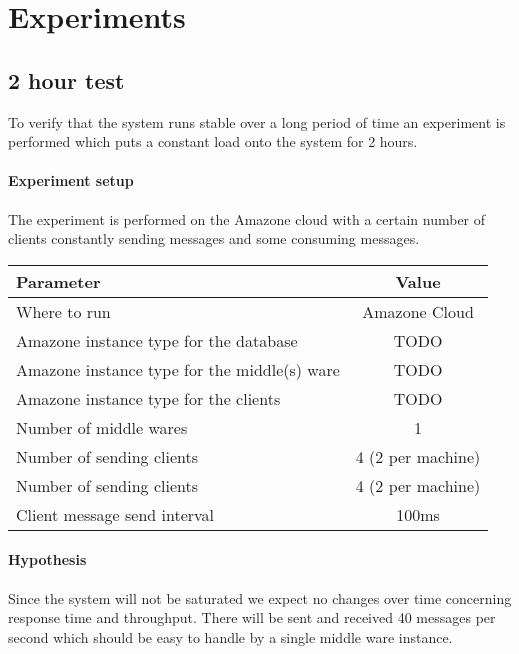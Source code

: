 \documentclass[milestone1.tex]{subfiles}
\begin{document}
\section{Experiments}




\subsection{2 hour test}
To verify that the system runs stable over a long period of time an experiment is performed which puts a constant load onto the system for 2 hours.

\paragraph{Experiment setup}
The experiment is performed on the Amazone cloud with a certain number of clients constantly sending messages and some consuming messages. 

\begin{tabular}{|l|c|}
\hline 
Parameter & Value \\
\hline 
Where to run & Amazone Cloud \\ 
Amazone instance type for the database & TODO \\ 
Amazone instance type for the middle(s) ware& TODO \\ 
Amazone instance type for the clients & TODO \\ 
Number of middle wares & 1 \\ 
Number of sending clients & 4 (2 per machine) \\ 
Number of sending clients & 4 (2 per machine) \\ 
Client message send interval & 100ms \\
\hline 
\end{tabular}

\paragraph{Hypothesis}
Since the system will not be saturated we expect no changes over time concerning response time and throughput. There will be sent and received 40 messages per second which should be easy to handle by a single middle ware instance.
\end{document}
